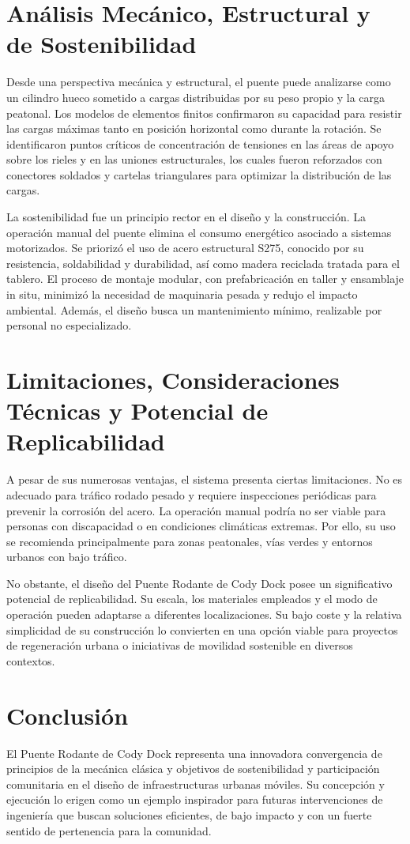 \documentclass{IEEEtran}
\begin{document}
\section{Análisis Mecánico, Estructural y de Sostenibilidad}

Desde una perspectiva mecánica y estructural, el puente puede analizarse como un cilindro hueco sometido a cargas distribuidas por su peso propio y la carga peatonal. Los modelos de elementos finitos confirmaron su capacidad para resistir las cargas máximas tanto en posición horizontal como durante la rotación. Se identificaron puntos críticos de concentración de tensiones en las áreas de apoyo sobre los rieles y en las uniones estructurales, los cuales fueron reforzados con conectores soldados y cartelas triangulares para optimizar la distribución de las cargas.

La sostenibilidad fue un principio rector en el diseño y la construcción. La operación manual del puente elimina el consumo energético asociado a sistemas motorizados. Se priorizó el uso de acero estructural S275, conocido por su resistencia, soldabilidad y durabilidad, así como madera reciclada tratada para el tablero. El proceso de montaje modular, con prefabricación en taller y ensamblaje in situ, minimizó la necesidad de maquinaria pesada y redujo el impacto ambiental. Además, el diseño busca un mantenimiento mínimo, realizable por personal no especializado.

\section{Limitaciones, Consideraciones Técnicas y Potencial de Replicabilidad}

A pesar de sus numerosas ventajas, el sistema presenta ciertas limitaciones. No es adecuado para tráfico rodado pesado y requiere inspecciones periódicas para prevenir la corrosión del acero. La operación manual podría no ser viable para personas con discapacidad o en condiciones climáticas extremas. Por ello, su uso se recomienda principalmente para zonas peatonales, vías verdes y entornos urbanos con bajo tráfico.

No obstante, el diseño del Puente Rodante de Cody Dock posee un significativo potencial de replicabilidad. Su escala, los materiales empleados y el modo de operación pueden adaptarse a diferentes localizaciones. Su bajo coste y la relativa simplicidad de su construcción lo convierten en una opción viable para proyectos de regeneración urbana o iniciativas de movilidad sostenible en diversos contextos.

\section{Conclusión}

El Puente Rodante de Cody Dock representa una innovadora convergencia de principios de la mecánica clásica y objetivos de sostenibilidad y participación comunitaria en el diseño de infraestructuras urbanas móviles. Su concepción y ejecución lo erigen como un ejemplo inspirador para futuras intervenciones de ingeniería que buscan soluciones eficientes, de bajo impacto y con un fuerte sentido de pertenencia para la comunidad.

\nocite{*}
\printbibliography
\end{document}
